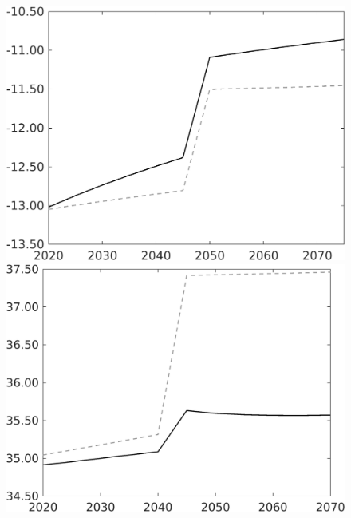 \begin{figure}[h!!]
\begin{minipage}[]{0.32\textwidth}
	\end{minipage}	
	\begin{minipage}[]{0.32\textwidth}
		\includegraphics[width=1\textwidth]{../../codding_model/own_basedOnFried/optimalPol_010922_revision/figures/all_13Sept22/CompTaufPER_bytaul_KN_Reg0_GFF_spillover0_nsk0_xgr0_knspil0_sep0_LFlimit1_emsbase0_countec0_GovRev0_etaa0.79_lgd0.png}
	 \end{minipage}	
	\begin{minipage}[]{0.32\textwidth}
		\includegraphics[width=1\textwidth]{../../codding_model/own_basedOnFried/optimalPol_010922_revision/figures/all_13Sept22/CompTaufPER_bytaul_KN_Reg0_gAf_spillover0_nsk0_xgr0_knspil0_sep0_LFlimit1_emsbase0_countec0_GovRev0_etaa0.79_lgd0.png} 

\end{minipage}
\end{figure}
